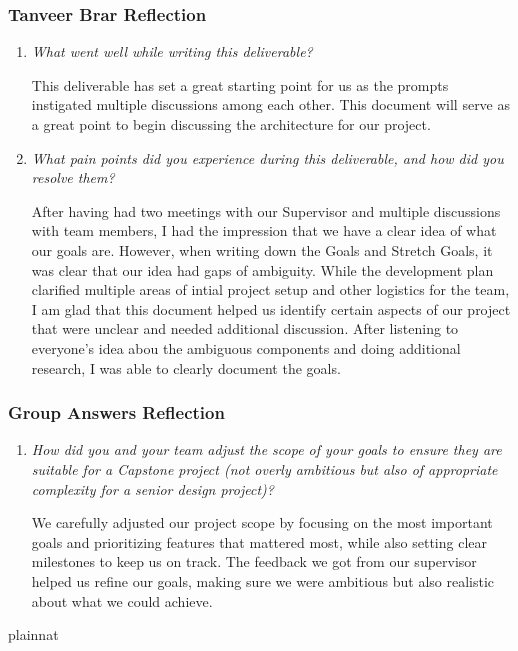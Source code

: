 \documentclass{article}
\begin{document}
\subsubsection*{Tanveer Brar Reflection}
\begin{enumerate}
  \item \textit{What went well while writing this deliverable?}

    This deliverable has set a great starting point for us as the prompts instigated multiple discussions among each other. This document will serve as a great point to begin discussing the architecture for our project.

  \item \textit{What pain points did you experience during this deliverable, and how did you resolve them?}

    After having had two meetings with our Supervisor and multiple discussions with team members, I had the impression that we have a clear idea of what our goals are. However, when writing down the Goals and Stretch Goals, it was clear that our idea had gaps of ambiguity. While the development plan clarified multiple areas of intial project setup and other logistics for the team, I am glad that this document helped us identify certain aspects of our project that were unclear and needed additional discussion. After listening to everyone's idea abou the ambiguous components and doing additional research, I was able to clearly document the goals.

\end{enumerate}

\subsubsection*{Group Answers Reflection}
\begin{enumerate}
  \item \textit{How did you and your team adjust the scope of your goals to ensure they are suitable for a Capstone project (not overly 
  ambitious but also of appropriate complexity for a senior design project)?}
  
  We carefully adjusted our project scope by focusing on the most important goals and prioritizing features that mattered most, while also 
  setting clear milestones to keep us on track. The feedback we got from our supervisor helped us refine our goals, making sure we were ambitious but
  also realistic about what we could achieve.
    
\end{enumerate}

 {plainnat}

\end{document}
